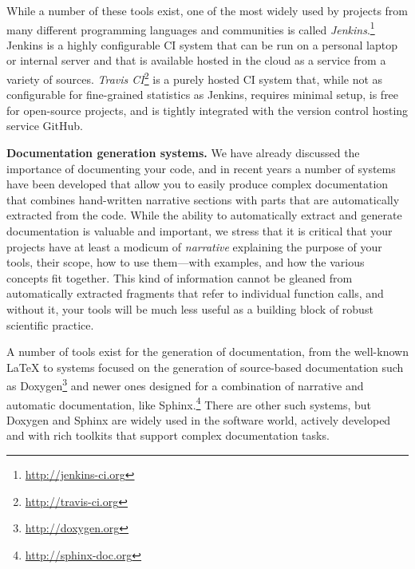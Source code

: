 \documentclass[11pt,oneside,english]{article}
\newcommand{\blockpar}[1]{\vspace*{3mm} \noindent \textbf{#1}}
\begin{document}
While a number of these tools exist, one of the most widely used by projects
from many different programming languages and communities is called
\emph{Jenkins}.\footnote{\url{http://jenkins-ci.org}}  Jenkins is a highly
configurable CI system that can be run on a personal laptop or internal server
and that is available hosted in the cloud as a service from a variety of
sources.  \emph{Travis CI}\footnote{\url{http://travis-ci.org}} is a purely
hosted CI system that, while not as configurable for fine-grained statistics as
Jenkins, requires minimal setup, is free for open-source projects, and is
tightly integrated with the version control hosting service GitHub.

\blockpar{Documentation generation systems.} We have already discussed the
importance of documenting your code, and in recent years a number of systems
have been developed that allow you to easily produce complex documentation that
combines hand-written narrative sections with parts that are automatically
extracted from the code.  While the ability to automatically extract and
generate documentation is valuable and important, we stress that it is critical
that your projects have at least a modicum of \emph{narrative} explaining the
purpose of your tools, their scope, how to use them---with examples, and how
the various concepts fit together.  This kind of information cannot be gleaned
from automatically extracted fragments that refer to individual function calls,
and without it, your tools will be much less useful as a building block of
robust scientific practice.

A number of tools exist for the generation of documentation, from the
well-known \LaTeX{} to systems focused on the generation of source-based
documentation such as Doxygen\footnote{\url{http://doxygen.org}} and newer ones
designed for a combination of narrative and automatic documentation, like
Sphinx.\footnote{\url{http://sphinx-doc.org}}  There are other such systems,
but Doxygen and Sphinx are widely used in the software world, actively
developed and with rich toolkits that support complex documentation tasks.
\end{document}
